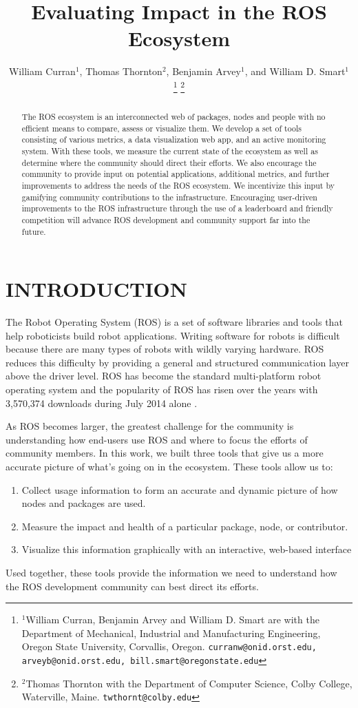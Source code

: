 \documentclass[letterpaper, 10 pt, conference]{ieeeconf}  %
\title{\LARGE \bf
Evaluating Impact in the ROS Ecosystem
}
\author{William Curran$^{1}$, Thomas Thornton$^{2}$, Benjamin Arvey$^{1}$, and William D. Smart$^{1}$ %
\thanks{$^{1}$William Curran, Benjamin Arvey and William D. Smart are with the Department of Mechanical, Industrial and Manufacturing Engineering, Oregon State University, Corvallis, Oregon.
        {\tt\small curranw@onid.orst.edu, arveyb@onid.orst.edu, bill.smart@oregonstate.edu}}%
\thanks{$^{2}$Thomas Thornton with the Department of Computer Science, Colby College, Waterville, Maine.
        {\tt\small twthornt@colby.edu}}%
}
\begin{document}
\maketitle
\thispagestyle{empty}
\pagestyle{empty}


\begin{abstract}
The ROS ecosystem is an interconnected web of packages, nodes and people with no efficient means to compare, assess or visualize them. We develop a set of tools consisting of various metrics, a data visualization web app, and an active monitoring system. With these tools, we measure the current state of the ecosystem as well as determine where the community should direct their efforts. We also encourage the community to provide input on potential applications, additional metrics, and further improvements to address the needs of the ROS ecosystem. We incentivize this input by gamifying community contributions to the infrastructure. Encouraging user-driven improvements to the ROS infrastructure through the use of a leaderboard and friendly competition will advance ROS development and community support far into the future.

\end{abstract}


\section{INTRODUCTION}

The Robot Operating System (ROS) is a set of software libraries and tools that help roboticists build robot applications. Writing software for robots is difficult because there are many types of robots with wildly varying hardware. ROS reduces this difficulty by providing a general and structured communication layer above the driver level. ROS has become the standard multi-platform robot operating system and the popularity of ROS has risen over the years with 3,570,374 downloads during July 2014 alone \cite{ros-metrics}.

As ROS becomes larger, the greatest challenge for the community is understanding how end-users use ROS and where to focus the efforts of community members. In this work, we built three tools that give us a more accurate picture of what's going on in the ecosystem. These tools allow us to: 

\begin{enumerate}
\item Collect usage information to form an accurate and dynamic picture of how nodes and packages are used.
\item Measure the impact and health of a particular package, node, or contributor.
\item Visualize this information graphically with an interactive, web-based interface
\end{enumerate}
Used together, these tools provide the information we need to understand how the ROS development community can best direct its efforts.
\end{document}
